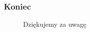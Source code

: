 \documentclass{beamer}
\begin{document}
\frame
{
	\frametitle{Koniec}
	\begin{figure}
	\centering
	Dziękujemy za uwagę
	\end{figure}
}



\end{document}
